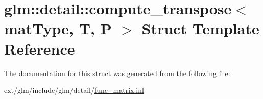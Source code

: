 \hypertarget{structglm_1_1detail_1_1compute__transpose}{\section{glm\-:\-:detail\-:\-:compute\-\_\-transpose$<$ mat\-Type, T, P $>$ Struct Template Reference}
\label{structglm_1_1detail_1_1compute__transpose}
}


The documentation for this struct was generated from the following file\-:\begin{DoxyCompactItemize}
\item 
ext/glm/include/glm/detail/\hyperlink{func__matrix_8inl}{func\-\_\-matrix.\-inl}\end{DoxyCompactItemize}
